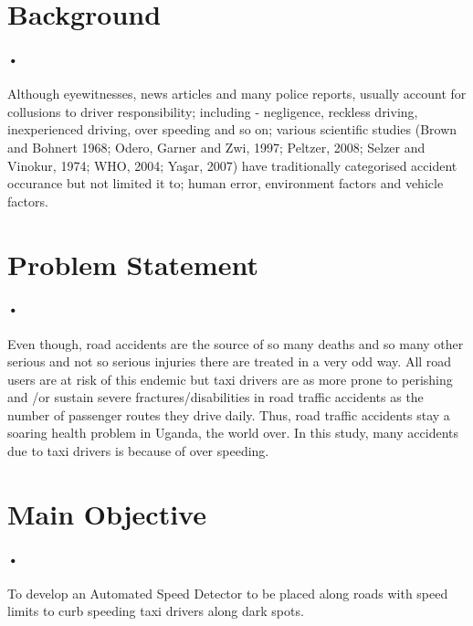 \documentclass[12pt]{article}
\begin{document}
\section{Background}
\paragraph{•}
Although eyewitnesses, news articles and many police reports, usually account for collusions to driver responsibility; including - negligence, reckless driving, inexperienced driving, over speeding and so on; various scientific studies (Brown and Bohnert 1968; Odero, Garner and Zwi, 1997; Peltzer, 2008; Selzer and Vinokur, 1974; WHO, 2004; Yaşar, 2007) have traditionally categorised accident occurance but not limited it to; human error, environment factors and vehicle factors.

\section{Problem Statement}
\paragraph{•}
Even though, road accidents are the source of so many deaths and so many other serious and not so serious injuries there are treated in a very odd way. All road users are at risk of this endemic but taxi drivers are as more prone to perishing and /or sustain severe fractures/disabilities in road traffic accidents as the number of passenger routes they drive daily. Thus, road traffic accidents stay a soaring health problem in Uganda, the world over. In this study, many accidents due to taxi drivers is because of over speeding.
  
\section{Main Objective}
\paragraph{•}
To develop an Automated Speed Detector to be placed along roads with speed limits to curb speeding taxi drivers along dark spots.
\end{document}
